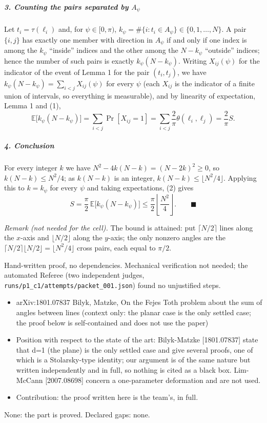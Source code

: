 \subparagraph{\texorpdfstring{3. Counting the pairs separated by
\(A_\psi\)}{3. Counting the pairs separated by A\_\textbackslash psi}}\label{counting-the-pairs-separated-by-a_psi}

Let \(t_i=\tau(\ell_i)\) and, for \(\psi\in[0,\pi)\),
\(k_\psi=\#\{i: t_i\in A_\psi\}\in\{0,1,\dots,N\}\). A pair \(\{i,j\}\)
has exactly one member with direction in \(A_\psi\) if and only if one
index is among the \(k_\psi\) ``inside'' indices and the other among the
\(N-k_\psi\) ``outside'' indices; hence the number of such pairs is
exactly \(k_\psi(N-k_\psi)\). Writing \(X_{ij}(\psi)\) for the indicator
of the event of Lemma 1 for the pair \((t_i,t_j)\), we have
\(k_\psi(N-k_\psi)=\sum_{i<j}X_{ij}(\psi)\) for every \(\psi\) (each
\(X_{ij}\) is the indicator of a finite union of intervals, so
everything is measurable), and by linearity of expectation, Lemma 1 and
(1),
\[\mathbb E\big[k_\psi(N-k_\psi)\big]=\sum_{i<j}\Pr[X_{ij}=1]=\sum_{i<j}\frac{2}{\pi}\theta(\ell_i,\ell_j)=\frac{2}{\pi}S.\tag{2}\]

\subparagraph{4. Conclusion}\label{conclusion}

For every integer \(k\) we have \(N^2-4k(N-k)=(N-2k)^2\ge0\), so
\(k(N-k)\le N^2/4\); as \(k(N-k)\) is an integer,
\(k(N-k)\le\lfloor N^2/4\rfloor\). Applying this to \(k=k_\psi\) for
every \(\psi\) and taking expectations, (2) gives
\[S=\frac{\pi}{2}\,\mathbb E\big[k_\psi(N-k_\psi)\big]\le\frac{\pi}{2}\left\lfloor\frac{N^2}{4}\right\rfloor.\qquad\blacksquare\]

\emph{Remark (not needed for the cell).} The bound is attained: put
\(\lceil N/2\rceil\) lines along the \(x\)-axis and
\(\lfloor N/2\rfloor\) along the \(y\)-axis; the only nonzero angles are
the \(\lceil N/2\rceil\lfloor N/2\rfloor=\lfloor N^2/4\rfloor\) cross
pairs, each equal to \(\pi/2\).


Hand-written proof, no dependencies. Mechanical verification not needed;
the automated Referee (two independent judges,
\texttt{runs/p1\_c1/attempts/packet\_001.json}) found no unjustified
steps.


\begin{itemize}
\tightlist
\item
  arXiv:1801.07837 Bilyk, Matzke, On the Fejes Toth problem about the
  sum of angles between lines (context only: the planar case is the only
  settled case; the proof below is self-contained and does not use the
  paper)
\item
  Position with respect to the state of the art: Bilyk-Matzke
  {[}1801.07837{]} state that d=1 (the plane) is the only settled case
  and give several proofs, one of which is a Stolarsky-type identity;
  our argument is of the same nature but written independently and in
  full, so nothing is cited as a black box. Lim-McCann {[}2007.08698{]}
  concern a one-parameter deformation and are not used.
\item
  Contribution: the proof written here is the team's, in full.
\end{itemize}


None: the part is proved. Declared gaps: none.

